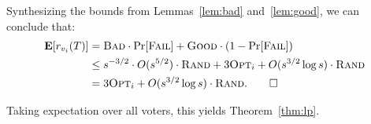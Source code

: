 Synthesizing the bounds from Lemmas~\ref{lem:bad} and~\ref{lem:good}, we can conclude that:
\begin{align*}
\operatorname{\mathbf{E}}[r_{v_i}(T)] &= {\normalfont\textsc{Bad}}\cdot \Pr[{\normalfont\textsc{Fail}}] + {\normalfont\textsc{Good}}\cdot (1-\Pr[{\normalfont\textsc{Fail}}])\\
&\leq  s^{-3/2} \cdot O(s^{5/2})\cdot {\normalfont\textsc{Rand}} + 3{\normalfont\textsc{Opt}}_i + O(s^{3/2}\log s)\cdot {\normalfont\textsc{Rand}} \\
&= 3{\normalfont\textsc{Opt}}_i + O(s^{3/2}\log s)\cdot {\normalfont\textsc{Rand}}.
\qedhere
\end{align*}

Taking expectation over all voters, this yields Theorem~\ref{thm:lp}.
